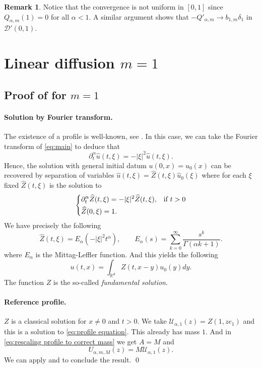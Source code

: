\documentclass[a4paper]{article}
\theoremstyle{definition}
\newtheorem{remark}[theorem]{Remark}
\newcommand{\Rd}{{\mathbb{R}^d}}
\begin{document}
\begin{remark}
  Notice that the convergence is not uniform in $[0,1]$ since $Q_{\alpha,m}(1) = 0$ for all $\alpha < 1$.
  A similar argument shows that $-Q'_{\alpha,m} \to b_{1,m} \delta_1$ in $\mathcal D'(0,1)$.
\end{remark}

%

\section{Linear diffusion $m = 1$}
\label{sec:m=1}

\subsection{Proof of  for $m = 1$}
\label{sec:existence proof m=1}
\paragraph{Solution by Fourier transform.}
The existence of a profile is well-known, see \cite{MR1061448, MR2047909,MR3631303}. In this case, we can take the Fourier transform of \eqref{eq:main} to deduce that
\begin{equation*}
  \partial_t^\alpha \widehat u(t, \xi) = -|\xi|^2 \widehat u(t,\xi).
\end{equation*}
Hence, the solution with general initial datum $u(0,x) = u_0(x)$ can be recovered by separation of variables $\widehat u(t,\xi) = \widehat Z(t,\xi) \widehat u_0(\xi)$
where for each $\xi$ fixed $\widehat Z(t,\xi)$ is the solution to
\[
  \begin{dcases}
    \partial_t^\alpha \widehat Z(t,\xi) = -|\xi|^2 \widehat Z(t,\xi), & \text{if } t > 0 \\
    \widehat Z(0,\xi)=1.
  \end{dcases}
\]
We have precisely the following
\begin{equation*}
  \widehat Z(t, \xi) = E_\alpha(-|\xi|^2t^\alpha), \qquad E_\alpha(s) = \sum_{k=0}^\infty \frac{s^k}{\Gamma(\alpha k +1)}.
\end{equation*}
where $E_\alpha$ is the Mittag-Leffler function.
And this yields the following
\[
  u(t,x) = \int_{\Rd} Z(t,x-y) u_0(y) dy.
\]
The function $Z$ is the so-called \emph{fundamental solution}.

\paragraph{Reference profile.}
$Z$ is a classical solution for $x \ne 0$ and $t > 0$. We take $\mathcal U_{\alpha,1}(z) = Z(1,z e_1)$ and this is a solution to \eqref{eq:profile equation}.
This already has mass $1$. And in \eqref{eq:rescaling profile to correct mass} we get $A = M$ and
\begin{equation*}
  U_{\alpha,m,M} (z) = M \mathcal U_{\alpha,1}(z).
\end{equation*}
We can apply  and  to conclude the result.
\qed
\end{document}
